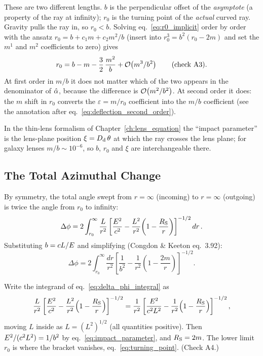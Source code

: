 \begin{annotation}
These are two different lengths.  $b$ is the perpendicular offset of the
\emph{asymptote} (a property of the ray at infinity); $r_0$ is the turning point
of the \emph{actual} curved ray.  Gravity pulls the ray in, so $r_0 < b$.
Solving eq.~\eqref{eq:r0_implicit} order by order with the ansatz
$r_0 = b + c_1 m + c_2 m^2/b$ (insert into $r_0^3 = b^2(r_0 - 2m)$ and set the
$m^1$ and $m^2$ coefficients to zero) gives
\[
    r_0 = b - m - \frac{3}{2}\,\frac{m^2}{b} + \mathcal{O}\!\left(m^3/b^2\right)
    \qquad (\text{check A3}).
\]
At first order in $m/b$ it does not matter which of the two appears in the
denominator of $\hat{\alpha}$, because the difference is $\mathcal{O}\!\left(m^2/b^2\right)$.  At
second order it does: the $m$ shift in $r_0$ converts the $\varepsilon = m/r_0$
coefficient into the $m/b$ coefficient (see the annotation after
eq.~\eqref{eq:deflection_second_order}).

In the thin-lens formalism of Chapter~\ref{ch:lens_equation} the ``impact parameter'' is the
lens-plane position $\xi = D_{\mathrm{d}}\,\theta$ at which the ray crosses the lens plane;
for galaxy lenses $m/b \sim 10^{-6}$, so $b$, $r_0$ and $\xi$ are
interchangeable there.
\end{annotation}
\subsection{The Total Azimuthal Change}
\label{sec:azimuthal_integral}

By symmetry, the total angle swept from $r = \infty$ (incoming) to
$r = \infty$ (outgoing) is twice the angle from $r_0$ to infinity:
\begin{equation}
    \Delta\phi = 2 \int_{r_0}^{\infty}
    \frac{L}{r^2}
    \left[\frac{E^2}{c^2}
    - \frac{L^2}{r^2}\!\left(1 - \frac{R_{\mathrm{S}}}{r}\right)
    \right]^{-1/2} dr \,.
    \label{eq:delta_phi_integral}
\end{equation}
Substituting $b = c L/E$ and simplifying
(Congdon \& Keeton eq.~3.92):
\begin{equation}
    \Delta\phi = 2 \int_{r_0}^{\infty}
    \frac{dr}{r^2}
    \left[\frac{1}{b^2}
    - \frac{1}{r^2}\!\left(1 - \frac{2m}{r}\right)
    \right]^{-1/2} .
    \label{eq:delta_phi_simplified}
\end{equation}


\begin{derivation}
Write the integrand of eq.~\eqref{eq:delta_phi_integral} as
\[
    \frac{L}{r^2}\left[\frac{E^2}{c^2}
    - \frac{L^2}{r^2}\Bigl(1 - \frac{R_{\mathrm{S}}}{r}\Bigr)\right]^{-1/2}
    = \frac{1}{r^2}\left[\frac{E^2}{c^2L^2}
    - \frac{1}{r^2}\Bigl(1 - \frac{R_{\mathrm{S}}}{r}\Bigr)\right]^{-1/2},
\]
moving $L$ inside as $L = (L^2)^{1/2}$ (all quantities positive).  Then
$E^2/(c^2L^2) = 1/b^2$ by eq.~\eqref{eq:impact_parameter}, and
$R_{\mathrm{S}} = 2m$.  The lower limit $r_0$ is where the bracket vanishes,
eq.~\eqref{eq:turning_point}.  (Check A4.)
\end{derivation}
